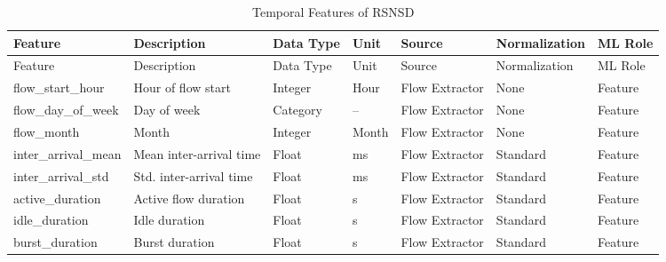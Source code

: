 \documentclass[12pt,a4paper]{article}
\begin{document}
\begin{longtable}{p{3cm}p{5cm}p{2cm}p{1.5cm}p{2.3cm}p{2cm}p{2cm}}
	\caption{Temporal Features of RSNSD}
	\label{tab:temporal_features}\\
	
	\toprule
	Feature & Description & Data Type & Unit & Source & Normalization & ML Role\\
	\midrule
	\endfirsthead
	
	\toprule
	Feature & Description & Data Type & Unit & Source & Normalization & ML Role\\
	\midrule
	\endhead
	
	flow\_start\_hour & Hour of flow start & Integer & Hour & Flow Extractor & None & Feature\\
	flow\_day\_of\_week & Day of week & Category & -- & Flow Extractor & None & Feature\\
	flow\_month & Month & Integer & Month & Flow Extractor & None & Feature\\
	inter\_arrival\_mean & Mean inter-arrival time & Float & ms & Flow Extractor & Standard & Feature\\
	inter\_arrival\_std & Std. inter-arrival time & Float & ms & Flow Extractor & Standard & Feature\\
	active\_duration & Active flow duration & Float & s & Flow Extractor & Standard & Feature\\
	idle\_duration & Idle duration & Float & s & Flow Extractor & Standard & Feature\\
	burst\_duration & Burst duration & Float & s & Flow Extractor & Standard & Feature\\
	
	\bottomrule
\end{longtable}
\end{document}
